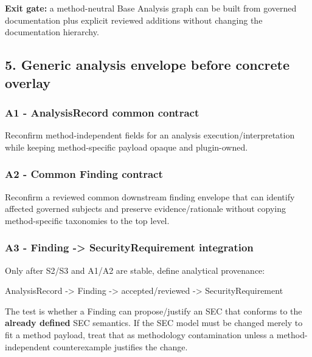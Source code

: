 \documentclass[
  11pt,
  a4paper,
]{article}
\newenvironment{Shaded}{}{}
\newcommand{\NormalTok}[1]{#1}
\begin{document}
\textbf{Exit gate:} a method-neutral Base Analysis graph can be built
from governed documentation plus explicit reviewed additions without
changing the documentation hierarchy.

\subsection{5. Generic analysis envelope before concrete
overlay}\label{generic-analysis-envelope-before-concrete-overlay}

\subsubsection{A1 - AnalysisRecord common
contract}\label{a1---analysisrecord-common-contract}

Reconfirm method-independent fields for an analysis
execution/interpretation while keeping method-specific payload opaque
and plugin-owned.

\subsubsection{A2 - Common Finding
contract}\label{a2---common-finding-contract}

Reconfirm a reviewed common downstream finding envelope that can
identify affected governed subjects and preserve evidence/rationale
without copying method-specific taxonomies to the top level.

\subsubsection{A3 - Finding -\textgreater{} SecurityRequirement
integration}\label{a3---finding---securityrequirement-integration}

Only after S2/S3 and A1/A2 are stable, define analytical provenance:

\begin{Shaded}
\begin{Highlighting}[]
\NormalTok{AnalysisRecord {-}\textgreater{} Finding {-}\textgreater{} accepted/reviewed {-}\textgreater{} SecurityRequirement}
\end{Highlighting}
\end{Shaded}

The test is whether a Finding can propose/justify an SEC that conforms
to the \textbf{already defined} SEC semantics. If the SEC model must be
changed merely to fit a method payload, treat that as methodology
contamination unless a method-independent counterexample justifies the
change.
\end{document}
